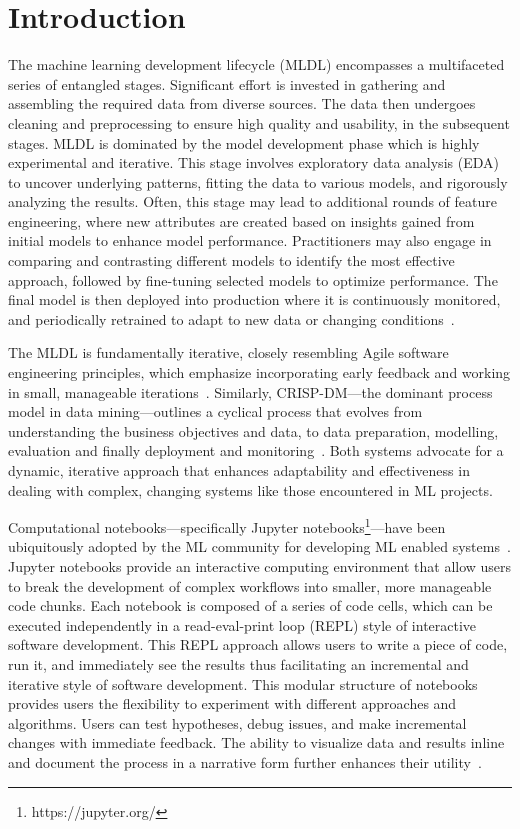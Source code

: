 \documentclass[journal]{IEEEtran}       %
\begin{document}
\section{Introduction}
The machine learning development lifecycle (MLDL) encompasses a
multifaceted series of entangled stages. Significant effort is
invested in gathering and assembling the required data from diverse
sources. The data then undergoes cleaning and preprocessing to ensure
high quality and usability, in the subsequent stages. MLDL is
dominated by the model development phase which is highly experimental
and iterative. This stage involves exploratory data analysis (EDA) to
uncover underlying patterns, fitting the data to various models, and
rigorously analyzing the results. Often, this stage may lead to
additional rounds of feature engineering, where new attributes are
created based on insights gained from initial models to enhance model
performance. Practitioners may also engage in comparing and
contrasting different models to identify the most effective approach,
followed by fine-tuning selected models to optimize performance. The
final model is then deployed into production where it is continuously
monitored, and periodically retrained to adapt to new data or
changing conditions~\cite{haakman2021ai,amershi2019software,sculley2015hidden}.

The MLDL is fundamentally iterative, closely resembling Agile
software engineering principles, which emphasize incorporating early
feedback and working in small, manageable
iterations~\cite{betz2018managing}. Similarly, CRISP-DM---the
dominant process model in data mining---outlines a cyclical process
that evolves from understanding the business objectives and data, to
data preparation, modelling, evaluation and finally deployment and
monitoring~\cite{martinez-plumed2021crisp-dm}. Both systems advocate
for a dynamic, iterative approach that enhances adaptability and
effectiveness in dealing with complex, changing systems like those
encountered in ML projects.

Computational notebooks---specifically Jupyter
notebooks\footnote{https://jupyter.org/}---have been ubiquitously
adopted by the ML community for developing ML enabled
systems~\cite{pimentel2019large-scale,quaranta2021kgtorrent,psallidas2019data,perkel2018why}.
Jupyter notebooks provide an interactive computing environment that
allow users to break the development of complex workflows into
smaller, more manageable code chunks. Each notebook is composed of a
series of code cells, which can be executed independently in a
read-eval-print loop (REPL) style of interactive software
development. This REPL approach allows users to write a piece of
code, run it, and immediately see the results thus facilitating an
incremental and iterative style of software development. This modular
structure of notebooks provides users the flexibility to experiment
with different approaches and algorithms. Users can test hypotheses,
debug issues, and make incremental changes with immediate feedback.
The ability to visualize data and results inline and document the
process in a narrative form further enhances their
utility~\cite{kery2018story,head2019managing,rule2018exploration,chattopadhyay2020whats}.
\end{document}
